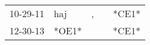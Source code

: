 \begin{supertabular}{lllll}
 10-29-11 &    haj &  , &   &  *CE1* \\
 12-30-13 &  *OE1* &    &   &  *CE1* \\
\end{supertabular}
